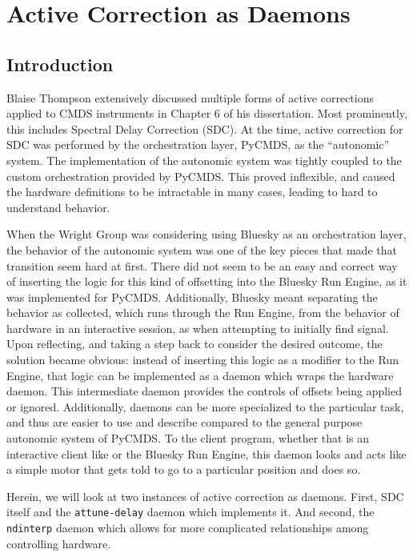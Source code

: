 \chapter{Active Correction as Daemons} \label{cha:act_corr}

\clearpage

\section{Introduction}  %

Blaise Thompson extensively discussed multiple forms of active corrections applied to CMDS instruments in Chapter 6 of his dissertation\cite{ThompsonBlaiseJonathan2018a}.
Most prominently, this includes Spectral Delay Correction (SDC).
At the time, active correction for SDC was performed by the orchestration layer, PyCMDS, as the ``autonomic'' system.
The implementation of the autonomic system was tightly coupled to the custom orchestration provided by PyCMDS.
This proved inflexible, and caused the hardware definitions to be intractable in many cases, leading to hard to understand behavior.

When the Wright Group was considering using Bluesky as an orchestration layer, the behavior of the autonomic system was one of the key pieces that made that transition seem hard at first.
There did not seem to be an easy and correct way of inserting the logic for this kind of offsetting into the Bluesky Run Engine, as it was implemented for PyCMDS.
Additionally, Bluesky meant separating the behavior as collected, which runs through the Run Engine, from the behavior of hardware in an interactive session, as when attempting to initially find signal.
Upon reflecting, and taking a step back to consider the desired outcome, the solution became obvious: instead of inserting this logic as a modifier to the Run Engine, that logic can be implemented as a daemon which wraps the hardware daemon.
This intermediate daemon provides the controls of offsets being applied or ignored.
Additionally, daemons can be more specialized to the particular task, and thus are easier to use and describe compared to the general purpose autonomic system of PyCMDS.
To the client program, whether that is an interactive client like \yaqcqtpy{} or the Bluesky Run Engine, this daemon looks and acts like a simple motor that gets told to go to a particular position and does so.

Herein, we will look at two instances of active correction as daemons.
First, SDC itself and the \texttt{attune-delay} daemon which implements it.
And second, the \texttt{ndinterp} daemon which allows for more complicated relationships among controlling hardware.

